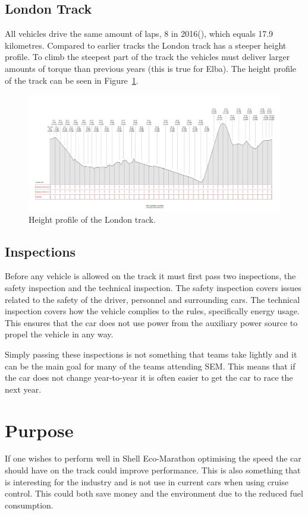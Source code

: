 \subsection{London Track}
All vehicles drive the same amount of laps, 8 in 2016(\cite{semrules16c2}),
which equals 17.9 kilometres. Compared to earlier tracks the London track has a
steeper height profile. To climb the steepest part of the track the vehicles
must deliver larger amounts of torque than previous years (this is true for
Elba). The height profile of the track can be seen in
Figure~\ref{fig:introduction_londontrack}.
\begin{figure}[H]
    \centering
    \includegraphics[width=\textwidth]{./img/introduction_londontrack.png}
    \caption{Height profile of the London track.}
    \label{fig:introduction_londontrack}
\end{figure}

\subsection{Inspections}
Before any vehicle is allowed on the track it must first pass two inspections,
the safety inspection and the technical inspection. The safety inspection covers
issues related to the safety of the driver, personnel and surrounding cars. 
The technical inspection covers how the vehicle complies to the rules,
specifically energy usage. This ensures that the car does not use power from the
auxiliary power source to propel the vehicle in any way.

Simply passing these inspections is not something that teams take lightly and it
can be the main goal for many of the teams attending SEM\@. This means that
if the car does not change year-to-year it is often easier to get the car to
race the next year.

\section{Purpose}
If one wishes to perform well in Shell Eco-Marathon optimising the speed the car should have on the track could improve performance. 
This is also something that is interesting for the industry and is not use in current cars when using cruise control. This could both save money and the environment due to the reduced fuel consumption.

